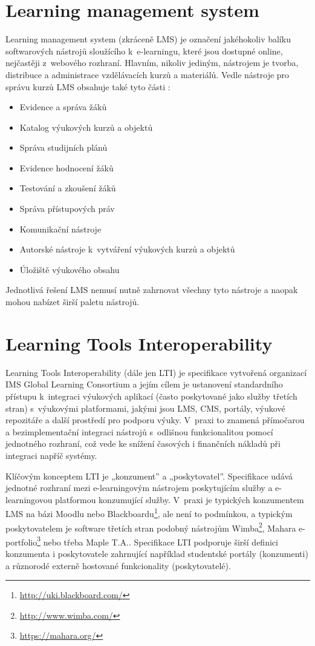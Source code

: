 \documentclass[
print,
  11pt,
  table,   
  nolof,    
  nolot,
  oneside,
  draft
]{fithesis3}
\begin{document}
	\section{Learning management system}
Learning management system (zkráceně LMS) je označení jakéhokoliv balíku softwarových nástrojů sloužícího k~e-learningu, které jsou dostupné online, nejčastěji z~webového rozhraní. Hlavním, nikoliv jediným, nástrojem je tvorba, distribuce a administrace vzdělávacích kurzů a materiálů. Vedle nástroje pro správu kurzů LMS obsahuje také tyto části \cite{lms}:
\begin{itemize}
	\item Evidence a správa žáků
	\item Katalog výukových kurzů a objektů
	\item Správa studijních plánů
	\item Evidence hodnocení žáků
	\item Testování a zkoušení žáků
	\item Správa přístupových práv
	\item Komunikační nástroje
	\item Autorské nástroje k~vytváření výukových kurzů a objektů
	\item Úložiště výukového obsahu
\end{itemize}
Jednotlivá řešení LMS nemusí nutně zahrnovat všechny tyto nástroje a naopak mohou nabízet širší paletu nástrojů.

	\section{Learning Tools Interoperability}
Learning Tools Interoperability{\textregistered} (dále jen LTI) je specifikace vytvořená organizací IMS Global Learning Consortium a jejím cílem je ustanovení standardního přístupu k~integraci výukových aplikací (často poskytované jako služby třetích stran) s~výukovými platformami, jakými jsou LMS, CMS, portály, výukové repozitáře a další prostředí pro podporu výuky. V~praxi to znamená přímočarou a bezimplementační integraci nástrojů s~odlišnou funkcionalitou pomocí jednotného rozhraní, což vede ke snížení časových i finančních nákladů při integraci napříč systémy. \cite{imslti}

Klíčovým konceptem LTI je „konzument” a „poskytovatel”. Specifikace udává jednotné rozhraní mezi e-learningovým nástrojem poskytujícím služ\-by a e-learningovou platformou konzumující služby. V~praxi je typických konzumentem LMS na bázi Moodlu nebo Blackboardu\footnote{\url{http://uki.blackboard.com/}}, ale není to podmínkou, a typickým poskytovatelem je software třetích stran podobný nástrojům Wimba\footnote{\url{http://www.wimba.com/}}, Mahara e-portfolio\footnote{\url{https://mahara.org/}} nebo třeba Maple T.A.. Specifikace LTI podporuje širší definici konzumenta i poskytovatele zahrnující například studentské portály (konzumenti) a různorodé externě hostované funkcionality (poskytovatelé). \cite{imsltiinvest}
\end{document}
